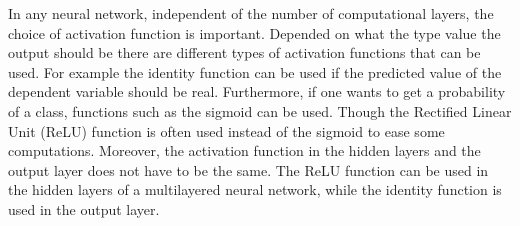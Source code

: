 
In any neural network, independent of the number of computational layers, the choice of activation function is important. Depended on what the type value the output should be there are different types of activation functions that can be used. For example the identity function can be used if the predicted value of the dependent variable should be real. Furthermore, if one wants to get a probability of a class, functions such as the sigmoid can be used. Though the Rectified Linear Unit (ReLU) function is often used instead of the sigmoid to ease some computations. Moreover, the activation function in the hidden layers and the output layer does not have to be the same. The ReLU function can be used in the hidden layers of a multilayered neural network, while the identity function is used in the output layer. 


